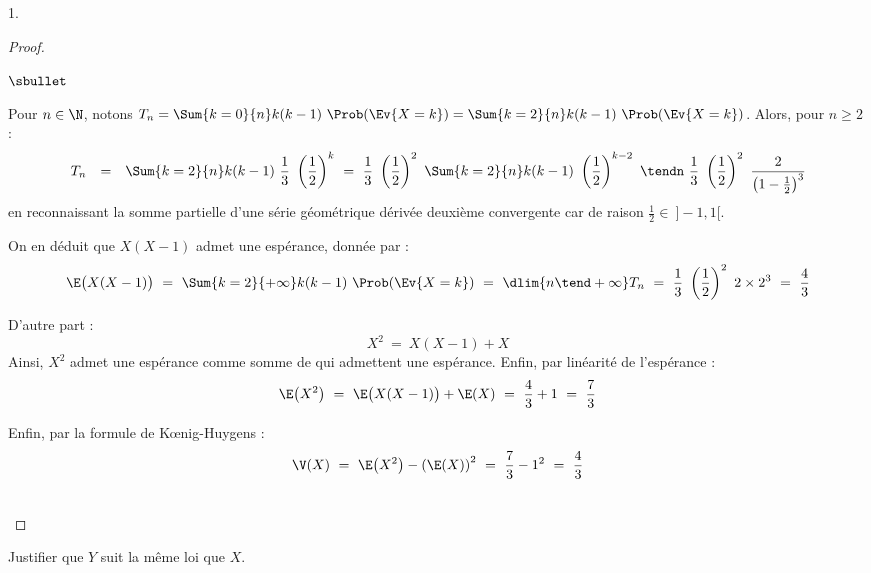 \documentclass[11pt]{article}%
\begin{document}
\begin{noliste}{1.}
\begin{proof}
\begin{noliste}{$\sbullet$}
    \item Pour $n \in \N$, notons $T_n = \Sum{k = 0}{n} k(k-1) \
      \Prob(\Ev{X = k}) = \Sum{k = 2}{n} k(k-1) \ \Prob(\Ev{X =
        k})$. Alors, pour $n \geq 2$ :
      \[
      \begin{array}{rcl}
        T_n & = & \Sum{k = 2}{n} k(k-1) \ \dfrac{1}{3} \ \left(
          \dfrac{1}{2} \right)^k 
        \ = \ \dfrac{1}{3} \ \left(\dfrac{1}{2}
        \right)^2 \ \Sum{k =  2}{n} k(k-1) \ \left( \dfrac{1}{2}
        \right)^{k-2}
        \ \tendn \ \dfrac{1}{3} \ \left(\dfrac{1}{2}
        \right)^2 \ \dfrac{2}{\left(1 - \frac{1}{2} \right)^3}
      \end{array}
      \]
      en reconnaissant la somme partielle d'une série géométrique
      dérivée deuxième convergente car de raison $\frac{1}{2} \in \
      ]-1,1[$.

    \item On en déduit que $X(X-1)$ admet une espérance, donnée par :
      \[
      \E\big( X(X-1) \big) \ = \ \Sum{k=2}{+\infty} k(k-1) \
      \Prob(\Ev{X = k}) \ = \ \dlim{n \tend +\infty} T_n \ = \
      \dfrac{1}{3} \ \left(\dfrac{1}{2} \right)^2 \ 2 \times 2^3 \ = \
      \dfrac{4}{3} 
      \]
      \conc{$\E\big( X(X-1) \big) = \dfrac{4}{3}$}

    \item D'autre part :
      \[
      X^2 \ = \ X(X-1) + X
      \]
      Ainsi, $X^2$ admet une espérance comme somme de \var qui
      admettent une espérance. Enfin, par linéarité de l'espérance :
      \[
      \E\big( X^2 \big) \ = \ \E\big( X(X-1) \big) + \E(X) \ = \
      \dfrac{4}{3} + 1 \ = \ \dfrac{7}{3}
      \]
      \conc{$\E\big( X^2 \big) \ = \ \dfrac{7}{3}$}

    \item Enfin, par la formule de K\oe{}nig-Huygens :
      \[
      \V(X) \ = \ \E\big( X^2 \big) - \left( \E(X) \right)^2 \ = \
      \dfrac{7}{3} - 1^2 \ = \ \dfrac{4}{3}
      \]
      \conc{$\V(X) \ = \ \dfrac{4}{3}$}
    \end{noliste}
    ~\\[-1.3cm]
  \end{proof}

\item Justifier que $Y$ suit la même loi que $X$.


\end{noliste}
\end{document}
